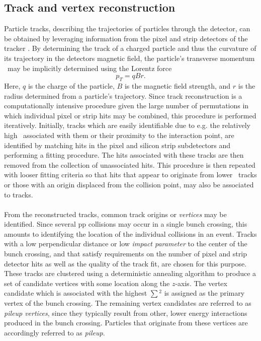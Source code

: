 \subsection{Track and vertex reconstruction}
\label{subsection:TrackingAndVertexing}
Particle tracks, describing the trajectories of particles through the detector, can be obtained by leveraging information from the pixel and strip detectors of the tracker \cite{CMSTrackReco}. By determining the track of a charged particle and thus the curvature of its trajectory in the detectors magnetic field, the particle's transverse momentum \pt \, may be implicitly determined using the Lorentz force
\begin{equation}
    p_{T} = q B r.
\end{equation}
 Here, $q$ is the charge of the particle, $B$ is the magnetic field strength, and $r$ is the radius determined from a particle's trajectory. Since track reconstruction is a computationally intensive procedure given the large number of permutations in which individual pixel or strip hits may be combined, this procedure is performed iteratively. Initially, tracks which are easily identifiable due to e.g. the relatively high \pt \ associated with them or their proximity to the interaction point, are identified by matching hits in the pixel and silicon strip subdetectors and performing a fitting procedure. The hits associated with these tracks are then removed from the collection of unassociated hits. This procedure is then repeated with looser fitting criteria so that hits that appear to originate from lower \pt \, tracks or those with an origin displaced from the collision point, may also be associated to tracks. \\
\\
From the reconstructed tracks, common track origins or \textit{vertices} may be identified. Since several pp collisions may occur in a single bunch crossing, this amounts to identifying the location of the individual collisions in an event. Tracks with a low perpendicular distance or low \textit{impact parameter} to the center of the bunch crossing, and that satisfy requirements on the number of pixel and strip detector hits as well as the quality of the track fit, are chosen for this purpose. These tracks are clustered using a deterministic annealing algorithm \cite{Annealing} to produce a set of candidate vertices with some location along the $z$-axis. The vertex candidate which is associated with the highest $\sum$\pt$^2$ is assigned as the primary vertex of the bunch crossing. The remaining vertex candidates are referred to as \textit{pileup vertices}, since they typically result from other, lower energy interactions produced in the bunch crossing. Particles that originate from these vertices are accordingly referred to as \textit{pileup}.

